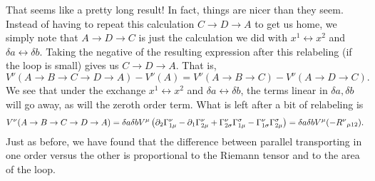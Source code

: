 That seems like a pretty long result! In fact, things are nicer than they seem. Instead of having to repeat this calculation $C\to D \to A$ to get us home, we simply note that $A\to D \to C$ is just the calculation we did with $x^1\leftrightarrow x^2$ and $\delta a \leftrightarrow \delta b$. Taking the negative of the resulting expression after this relabeling (if the loop is small) gives us $C\to D \to A$. That is, 
$$V^\nu(A\to B \to C \to D \to A)-V^\nu (A)=V^\nu(A\to B \to C)-V^\nu(A \to D \to C).$$
We see that under the exchange $x^1\leftrightarrow x^2$ and $\delta a \leftrightarrow \delta b$, the terms linear in $\delta a, \delta b$ will go away, as will the zeroth order term. What is left after a bit of relabeling is
$$V^\nu(A\to B \to C \to D \to A)=\delta a \delta b
V^\mu \left(\partial_2 \Gamma^\nu_{1\mu} -\partial_1 \Gamma^\nu_{2 \mu} +\Gamma^\nu_{2\sigma} \Gamma^\sigma_{1\mu} - \Gamma^\nu_{1\sigma} \Gamma^\sigma_{2\mu}\right)=\delta a \delta b V^\mu (-{R^\nu}_{\mu 12}).$$
Just as before, we have found that the difference between parallel transporting in one order versus the other is proportional to the Riemann tensor and to the area of the loop.